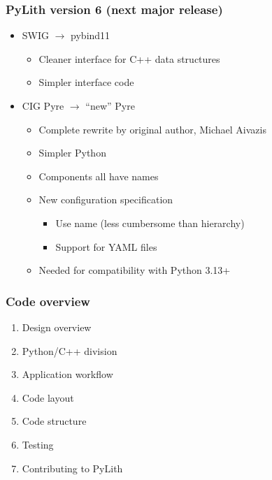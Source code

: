 \documentclass[aspectratio=169]{beamer}
\begin{document}
\begin{frame}
  \frametitle{PyLith version 6 (next major release)}
  \summary{}
  
  \begin{itemize}
  \item SWIG $\rightarrow$ pybind11
    \begin{itemize}
    \item Cleaner interface for C++ data structures
    \item Simpler interface code
    \end{itemize}
  \item CIG Pyre $\rightarrow$ ``new'' Pyre
    \begin{itemize}
    \item Complete rewrite by original author, Michael Aivazis
    \item Simpler Python
    \item Components all have names
    \item New configuration specification
      \begin{itemize}
      \item Use name (less cumbersome than hierarchy)
      \item Support for YAML files
      \end{itemize}
    \item Needed for compatibility with Python 3.13+
    \end{itemize}
  \end{itemize}

\end{frame}


\begin{frame}
  \frametitle{Code overview}
  \summary{}
  
  \begin{enumerate}
  \item Design overview
  \item Python/C++ division
  \item Application workflow
  \item Code layout
  \item Code structure
  \item Testing
  \item Contributing to PyLith
  \end{enumerate}

\end{frame}
\end{document}
